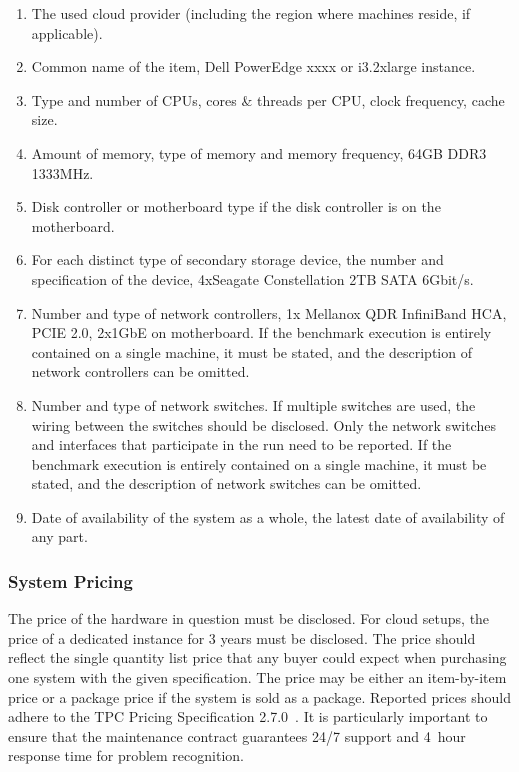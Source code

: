 \begin{enumerate}
    \item The used cloud provider (including the region where machines reside, if applicable).
    \item Common name of the item, \eg Dell PowerEdge xxxx or i3.2xlarge instance.
    \item Type and number of CPUs, cores \& threads per CPU, clock frequency, cache size.
    \item Amount of memory, type of memory and memory frequency, \eg 64GB DDR3 1333MHz.
    \item Disk controller or motherboard type if the disk controller is on the motherboard.
    \item For each distinct type of secondary storage device, the number and specification of the device, \eg 4xSeagate Constellation 2TB SATA 6Gbit/s.
    \item Number and type of network controllers, \eg 1x Mellanox QDR InfiniBand HCA, PCIE 2.0, 2x1GbE on motherboard. If the benchmark execution is entirely contained on a single machine, it must be stated, and the description of network controllers can be omitted.
    \item Number and type of network switches. If multiple switches are used, the wiring between the switches should be disclosed.
    Only the network switches and interfaces that participate in the run need to be reported. If the benchmark execution is entirely contained on a single machine, it must be stated, and the description of network switches can be omitted.
    \item Date of availability of the system as a whole, \ie the latest date of availability of any part.
\end{enumerate}

\subsubsection{System Pricing}
The price of the hardware in question must be disclosed. For cloud setups, the price of a dedicated instance for 3 years must be disclosed. The price should reflect the single quantity list price that any buyer could expect when purchasing one system with the given specification. The price may be either an item-by-item price or a package price if the system is sold as a package.
Reported prices should adhere to the TPC Pricing Specification 2.7.0~\cite{pricing,tpc-pricing}.
It is particularly important to ensure that the maintenance contract guarantees 24/7 support and 4~hour response time for problem recognition.

